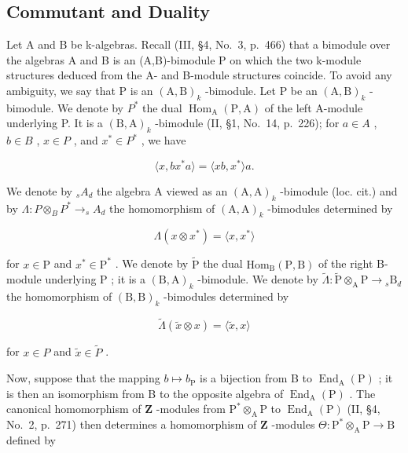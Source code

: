 \subsection{Commutant and Duality}

Let A and B be k-algebras. Recall (III, §4, No.~3, p.~466) that a bimodule over the algebras A and B is an (A,B)-bimodule P on which the two k-module structures deduced from the A- and B-module structures coincide. To avoid any ambiguity, we say that P is an \((\mathrm{A},\mathrm{B})_{k}\) -bimodule. Let P be an \((\mathrm{A},\mathrm{B})_{k}\) -bimodule. We denote by \(P^{*}\) the dual \(\operatorname{Hom}_{\mathrm{A}}(\mathrm{P},\mathrm{A})\) of the left A-module underlying P. It is a \((\mathrm{B},\mathrm{A})_{k}\) -bimodule (II, §1, No.~14, p.~226); for \(a \in A\) , \(b \in B\) , \(x \in P\) , and \(x^{*} \in P^{*}\) , we have

\[
\langle x, b x ^ {*} a \rangle = \langle x b, x ^ {*} \rangle a.\tag{1}
\]

We denote by \(_{s}A_{d}\) the algebra A viewed as an \((\mathrm{A},\mathrm{A})_{k}\) -bimodule (loc. cit.) and by \(\Lambda:P\otimes_{B}P^{*}\to_{s}A_{d}\) the homomorphism of \((\mathrm{A},\mathrm{A})_{k}\) -bimodules determined by

\[
\Lambda (x \otimes x ^ {*}) = \langle x, x ^ {*} \rangle\tag{2}
\]

for \(x \in \mathrm{P}\) and \(x^{*} \in \mathrm{P}^{*}\) . We denote by \(\widetilde{\mathrm{P}}\) the dual \(\mathrm{Hom}_{\mathrm{B}}(\mathrm{P},\mathrm{B})\) of the right B-module underlying \(\mathrm{P}\) ; it is a \((\mathrm{B},\mathrm{A})_{k}\) -bimodule. We denote by \(\widetilde{\Lambda}: \widetilde{\mathrm{P}} \otimes_{\mathrm{A}} \mathrm{P} \to {}_{s}\mathrm{B}_{d}\) the homomorphism of \((\mathrm{B},\mathrm{B})_{k}\) -bimodules determined by

\[
\widetilde {\Lambda} (\widetilde {x} \otimes x) = \langle \widetilde {x}, x \rangle\tag{3}
\]

for \(x \in P\) and \(\widetilde{x} \in \widetilde{P}\) .

Now, suppose that the mapping \(b \mapsto b_{\mathrm{P}}\) is a bijection from B to \(\operatorname{End}_{\mathrm{A}}(\mathrm{P})\) ; it is then an isomorphism from B to the opposite algebra of \(\operatorname{End}_{\mathrm{A}}(\mathrm{P})\) . The canonical homomorphism of \(\mathbf{Z}\) -modules from \(\mathrm{P}^* \otimes_{\mathrm{A}} \mathrm{P}\) to \(\operatorname{End}_{\mathrm{A}}(\mathrm{P})\) (II, §4, No.~2, p.~271) then determines a homomorphism of \(\mathbf{Z}\) -modules \(\Theta: \mathrm{P}^* \otimes_{\mathrm{A}} \mathrm{P} \to \mathrm{B}\) defined by

